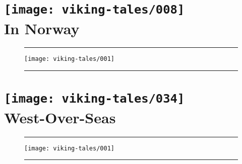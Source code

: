 \documentclass[a4paper,12pt,twoside]{book}
\def \chapfig {
    \newpage
    \begin{figure}
        \noindent\rule{\textwidth}{.4pt}
        \vskip8pt
        \centering
        \texttt{[image: viking-tales/001]}
        \noindent\rule{\textwidth}{.4pt}
    \end{figure}
    \cleardoublepage
}
\begin{document}
    \thefrontmatter

    \chapter[In Norway]{
    \texttt{[image: viking-tales/008]}\\[1cm]
    In Norway}
    \chapfig
    
    
    
    
    
    
    
    
    
    
    

    \chapter[West-Over-Seas]{
        \texttt{[image: viking-tales/034]}\\[1cm]
        West-Over-Seas}
    \chapfig
    
    
    
    

    \backmatter
    \appendix
    
    \fulllicense
\end{document}
